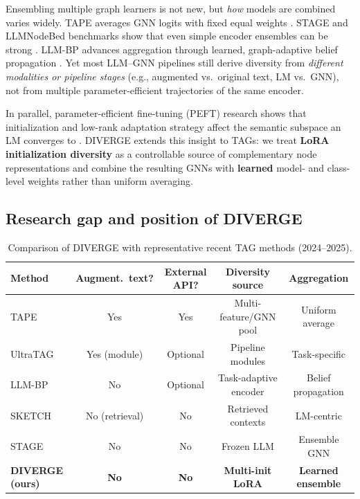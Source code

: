 \documentclass[a4paper,fleqn]{cas-sc}
\begin{document}
Ensembling multiple graph learners is not new, but \emph{how} models are combined varies widely. TAPE averages GNN logits with fixed equal weights \citep{he2024harnessing}. STAGE and LLMNodeBed benchmarks show that even simple encoder ensembles can be strong \citep{zolnai-lucas-etal-2024-stage, Wu2025LLMNode}. LLM-BP advances aggregation through learned, graph-adaptive belief propagation \citep{wang2025llmbp}. Yet most LLM--GNN pipelines still derive diversity from \emph{different modalities or pipeline stages} (e.g., augmented vs.\ original text, LM vs.\ GNN), not from multiple parameter-efficient trajectories of the same encoder.

In parallel, parameter-efficient fine-tuning (PEFT) research shows that initialization and low-rank adaptation strategy affect the semantic subspace an LM converges to \citep{Hu2021LoRA, meng2024pissa, paischer2024eva, li2023loftq, zhang2025orthogonal, wang2025peft}. DIVERGE extends this insight to TAGs: we treat \textbf{LoRA initialization diversity} as a controllable source of complementary node representations and combine the resulting GNNs with \textbf{learned} model- and class-level weights rather than uniform averaging.

\subsection{Research gap and position of DIVERGE}

\begin{table}[htbp]
\centering
\caption{Comparison of DIVERGE with representative recent TAG methods (2024--2025).}
\label{tab:related_gap}
\small
\begin{tabular*}{\linewidth}{@{\extracolsep{\fill}} lcccc @{}}
\toprule
\textbf{Method} & \textbf{Augment.\ text?} & \textbf{External API?} & \textbf{Diversity source} & \textbf{Aggregation} \\
\midrule
TAPE \citep{he2024harnessing} & Yes & Yes & Multi-feature/GNN pool & Uniform average \\
UltraTAG \citep{yu2025ultratag} & Yes (module) & Optional & Pipeline modules & Task-specific \\
LLM-BP \citep{wang2025llmbp} & No & Optional & Task-adaptive encoder & Belief propagation \\
SKETCH \citep{zhou-etal-2025sketch} & No (retrieval) & No & Retrieved contexts & LM-centric \\
STAGE \citep{zolnai-lucas-etal-2024-stage} & No & No & Frozen LLM & Ensemble GNN \\
\textbf{DIVERGE (ours)} & \textbf{No} & \textbf{No} & \textbf{Multi-init LoRA} & \textbf{Learned ensemble} \\
\bottomrule
\end{tabular*}
\end{table}
\end{document}
